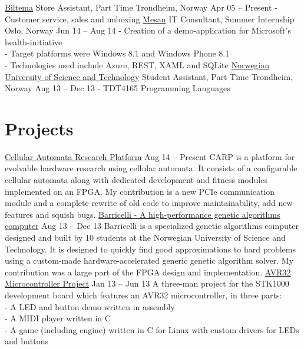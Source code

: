 \documentclass[print]{friggeri-cv}
\begin{document}
\begin{entrylist}
    \entryx
        {\href{http://biltema.no/}{Biltema}}
        {Store Assistant, Part Time}
        {Trondheim, Norway}
        {Apr 05 – Present}
        {- Customer service, sales and unboxing}
    \entryspace
    \entryx
        {\href{http://mesan.no/}{Mesan}}
        {IT Consultant, Summer Internship}
        {Oslo, Norway}
        {Jun 14 – Aug 14}
        {- Creation of a demo-application for Microsoft's health-initiative\\
         - Target platforms were Windows 8.1 and Windows Phone 8.1\\
         - Technologies used include Azure, REST, XAML and SQLite}
    \entryspace
    \entryx
        {\href{http://ntnu.no/}{Norwegian University of Science and Technology}}
        {Student Assistant, Part Time}
        {Trondheim, Norway}
        {Aug 13 – Dec 13}
        {- TDT4165 Programming Languages}
\end{entrylist}

\section{Projects}

\begin{entrylist}
    \entryy
        {\href{https://github.com/lundal/carp}{Cellular Automata Research Platform}}
        {Aug 14 – Present}
        {CARP is a platform for evolvable hardware research using cellular automata.
         It consists of a configurable cellular automata along with dedicated development and fitness modules implemented on an FPGA.
         My contribution is a new PCIe communication module and a complete rewrite of old code to improve maintainability, add new features and squish bugs.}
    \entryspace
    \entryy
        {\href{http://lund.al/barricel.li/}{Barricelli - A high-performance genetic algorithms computer}}
        {Aug 13 – Dec 13}
        {Barricelli is a specialized genetic algorithms computer designed and built by 10 students at the Norwegian University of Science and Technology.
         It is designed to quickly find good approximations to hard problems using a custom-made hardware-accelerated generic genetic algorithm solver.
         My contribution was a large part of the FPGA design and implementation.}
    \entryspace
    \entryy
        {\href{https://github.com/lundal/avr32-project-2013}{AVR32 Microcontroller Project}}
        {Jan 13 – Jun 13}
        {A three-man project for the STK1000 development board which features an AVR32 microcontroller, in three parts:\\
        - A LED and button demo written in assembly\\
        - A MIDI player written in C\\
        - A game (including engine) written in C for Linux with custom drivers for LEDs and buttons}
\end{entrylist}
\end{document}
